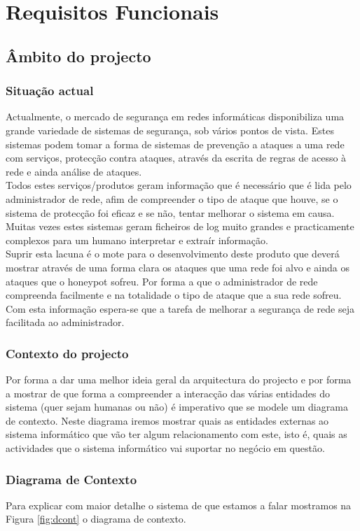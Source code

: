 \chapter{Requisitos Funcionais}
\minitoc
\section{Âmbito do projecto}
\subsection{Situação actual}
Actualmente, o mercado de segurança em redes informáticas disponibiliza uma grande variedade de sistemas de segurança, sob vários pontos de vista.
Estes sistemas podem tomar a forma de sistemas de prevenção a ataques a uma rede com serviços, protecção contra ataques, através da
escrita de regras de acesso à rede e ainda análise de ataques.\\
Todos estes serviços/produtos geram informação que é necessário que é lida pelo administrador de rede, afim de compreender o tipo de ataque que houve,
se o sistema de protecção foi eficaz e se não, tentar melhorar o sistema em causa.\\
Muitas vezes estes sistemas geram ficheiros de log muito grandes e practicamente complexos para um humano interpretar e extraír informação.\\
Suprir esta lacuna é o mote para o desenvolvimento deste produto que deverá mostrar através de uma forma clara os ataques que uma rede foi alvo
e ainda os ataques que o honeypot sofreu. Por forma a que o administrador de rede compreenda facilmente e na totalidade o tipo de ataque que a sua rede sofreu.
Com esta informação espera-se que a tarefa de melhorar a segurança de rede seja facilitada ao administrador.

\subsection{Contexto do projecto}
Por forma a dar uma melhor ideia geral da arquitectura do projecto e por forma a mostrar de que forma a compreender
a interacção das várias entidades do sistema (quer sejam humanas ou não) é imperativo que se modele um diagrama de contexto.
Neste diagrama iremos mostrar quais as entidades externas ao sistema informático que vão ter algum relacionamento com este, 
isto é, quais as actividades que o sistema informático vai suportar no negócio em questão. 

\subsection{Diagrama de Contexto}
Para explicar com maior detalhe o sistema de que estamos a falar mostramos na Figura \ref{fig:dcont} o diagrama de contexto.

